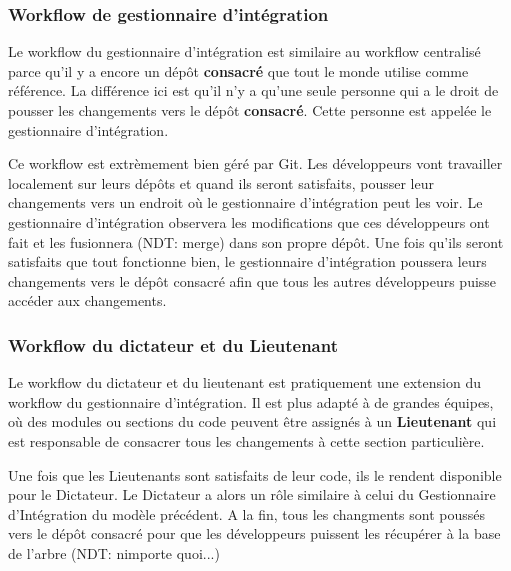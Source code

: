 
\subsubsection{Workflow de gestionnaire d'intégration}
Le workflow du gestionnaire d'intégration est similaire au workflow centralisé parce qu'il y a encore un dépôt \textbf{consacré} que tout le monde utilise comme référence.
La différence ici est qu'il n'y a qu'une seule personne qui a le droit de pousser les changements vers le dépôt \textbf{consacré}.
Cette personne est appelée le gestionnaire d'intégration.

Ce workflow est extrèmement bien géré par Git.
Les développeurs vont travailler localement sur leurs dépôts et quand ils seront satisfaits, pousser leur changements vers un endroit où le gestionnaire d'intégration peut les voir.
Le gestionnaire d'intégration observera les modifications que ces développeurs ont fait et les fusionnera (NDT: merge) dans son propre dépôt.
Une fois qu'ils seront satisfaits que tout fonctionne bien, le gestionnaire d'intégration poussera leurs changements vers le dépôt consacré afin que tous les autres développeurs puisse accéder aux changements.


\subsubsection{Workflow du dictateur et du Lieutenant}
Le workflow du dictateur et du lieutenant est pratiquement une extension du workflow du gestionnaire d'intégration.
Il est plus adapté à de grandes équipes, où des modules ou sections du code peuvent être assignés à un \textbf{Lieutenant} qui est responsable de consacrer tous les changements à cette section particulière.

Une fois que les Lieutenants sont satisfaits de leur code, ils le rendent disponible pour le Dictateur.
Le Dictateur a alors un rôle similaire à celui du Gestionnaire d'Intégration du modèle précédent.
A la fin, tous les changments sont poussés vers le dépôt consacré pour que les développeurs puissent les récupérer à la base de l'arbre (NDT: nimporte quoi...)


